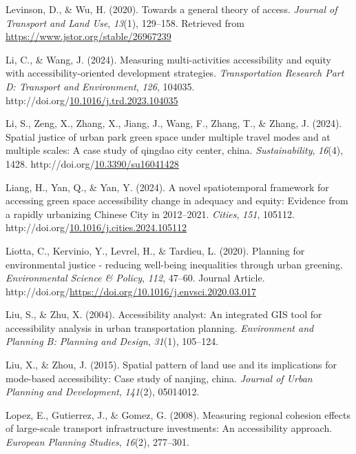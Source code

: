 \documentclass[
11pt, %
oneside, %
english, %
singlespacing, %
]{macthesis} %
\newlength{\cslhangindent}
\newenvironment{CSLReferences}[2] %
{\begin{list}{}{%
	\setlength{\itemindent}{0pt}
	\setlength{\leftmargin}{0pt}
	\setlength{\parsep}{0pt}
	\ifodd #1
	\setlength{\leftmargin}{\cslhangindent}
	\setlength{\itemindent}{-1\cslhangindent}
	\fi
	\setlength{\itemsep}{#2\baselineskip}}}
{\end{list}}
\begin{document}
\begin{CSLReferences}{1}{0}
Levinson, D., \& Wu, H. (2020). Towards a general theory of access. \emph{Journal of Transport and Land Use}, \emph{13}(1), 129--158. Retrieved from \url{https://www.jstor.org/stable/26967239}

Li, C., \& Wang, J. (2024). Measuring multi-activities accessibility and equity with accessibility-oriented development strategies. \emph{Transportation Research Part D: Transport and Environment}, \emph{126}, 104035. http://doi.org/\href{https://doi.org/10.1016/j.trd.2023.104035}{10.1016/j.trd.2023.104035}

Li, S., Zeng, X., Zhang, X., Jiang, J., Wang, F., Zhang, T., \& Zhang, J. (2024). Spatial justice of urban park green space under multiple travel modes and at multiple scales: A case study of qingdao city center, china. \emph{Sustainability}, \emph{16}(4), 1428. http://doi.org/\href{https://doi.org/10.3390/su16041428}{10.3390/su16041428}

Liang, H., Yan, Q., \& Yan, Y. (2024). A novel spatiotemporal framework for accessing green space accessibility change in adequacy and equity: {Evidence} from a rapidly urbanizing {Chinese} {City} in 2012--2021. \emph{Cities}, \emph{151}, 105112. http://doi.org/\href{https://doi.org/10.1016/j.cities.2024.105112}{10.1016/j.cities.2024.105112}

Liotta, C., Kervinio, Y., Levrel, H., \& Tardieu, L. (2020). Planning for environmental justice - reducing well-being inequalities through urban greening. \emph{Environmental Science \& Policy}, \emph{112}, 47--60. Journal Article. http://doi.org/\url{https://doi.org/10.1016/j.envsci.2020.03.017}

Liu, S., \& Zhu, X. (2004). Accessibility analyst: An integrated GIS tool for accessibility analysis in urban transportation planning. \emph{Environment and Planning B: Planning and Design}, \emph{31}(1), 105--124.

Liu, X., \& Zhou, J. (2015). Spatial pattern of land use and its implications for mode-based accessibility: Case study of nanjing, china. \emph{Journal of Urban Planning and Development}, \emph{141}(2), 05014012.

Lopez, E., Gutierrez, J., \& Gomez, G. (2008). Measuring regional cohesion effects of large-scale transport infrastructure investments: {An} accessibility approach. \emph{European Planning Studies}, \emph{16}(2), 277--301.


\end{CSLReferences}
\end{document}
